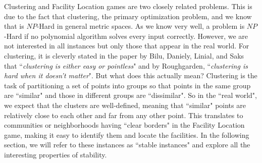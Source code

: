 




Clustering and Facility Location games are two closely related problems. This is due to the fact that clustering, the primary optimization problem, and we know that is $NP$-Hard in general metric spaces. As we know very well, a problem is $NP$-Hard if no polynomial algorithm solves every input correctly. However, we are not interested in all instances but only those that appear in the real world. For clustering, it is cleverly stated in the paper by Bilu, Daniely, Linial, and Saks that  ``\emph{clustering is either easy or pointless}"\cite{bilu2012} and by Roughgarden,  ``\emph{clustering is hard when it doesn't matter}"\cite{Rough17_lect6}. But what does this actually mean? Clustering is the task of partitioning a set of points into groups so that points in the same group are ``similar" and those in different groups are ``dissimilar".  So in the ``real world", we expect that the clusters are well-defined, meaning that ``similar" points are relatively close to each other and far from any other point. This translates to communities or neighborhoods having ``clear borders" in the Facility Location game, making it easy to identify them and locate the facilities.  In the following section, we will refer to these instances as ``stable instances" and explore all the interesting properties of stability.


